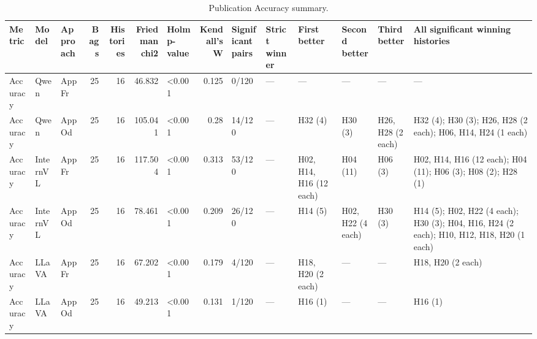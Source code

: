 \begin{table}[tbp]
\caption{Publication Accuracy summary.}
\label{tab:rq3-accuracy-summary}
\begin{tabular}{lllrrrlrllllll}
\toprule
Metric & Model & Approach & Bags & Histories & Friedman chi2 & Holm p-value & Kendall's W & Significant pairs & Strict winner & First better & Second better & Third better & All significant winning histories \\
\midrule
Accuracy & Qwen & AppFr & 25 & 16 & 46.832 & <0.001 & 0.125 & 0/120 & — & — & — & — & — \\
Accuracy & Qwen & AppOd & 25 & 16 & 105.041 & <0.001 & 0.28 & 14/120 & — & H32 (4) & H30 (3) & H26, H28 (2 each) & H32 (4); H30 (3); H26, H28 (2 each); H06, H14, H24 (1 each) \\
Accuracy & InternVL & AppFr & 25 & 16 & 117.504 & <0.001 & 0.313 & 53/120 & — & H02, H14, H16 (12 each) & H04 (11) & H06 (3) & H02, H14, H16 (12 each); H04 (11); H06 (3); H08 (2); H28 (1) \\
Accuracy & InternVL & AppOd & 25 & 16 & 78.461 & <0.001 & 0.209 & 26/120 & — & H14 (5) & H02, H22 (4 each) & H30 (3) & H14 (5); H02, H22 (4 each); H30 (3); H04, H16, H24 (2 each); H10, H12, H18, H20 (1 each) \\
Accuracy & LLaVA & AppFr & 25 & 16 & 67.202 & <0.001 & 0.179 & 4/120 & — & H18, H20 (2 each) & — & — & H18, H20 (2 each) \\
Accuracy & LLaVA & AppOd & 25 & 16 & 49.213 & <0.001 & 0.131 & 1/120 & — & H16 (1) & — & — & H16 (1) \\
\bottomrule
\end{tabular}
\end{table}
